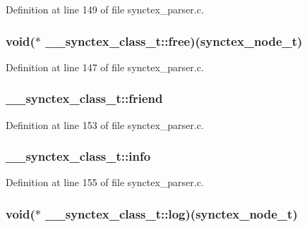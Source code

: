 Definition at line 149 of file synctex\+\_\+parser.\+c.

\hypertarget{struct____synctex__class__t_a251c015a17ed979c27cfc0934ab54f76}{
\subsubsection[{free}]{\setlength{\rightskip}{0pt plus 5cm}void($\ast$ \+\_\+\+\_\+synctex\+\_\+class\+\_\+t\+::free)({\bf synctex\+\_\+node\+\_\+t})}}\label{struct____synctex__class__t_a251c015a17ed979c27cfc0934ab54f76}


Definition at line 147 of file synctex\+\_\+parser.\+c.

\hypertarget{struct____synctex__class__t_a8bbbd0ccfd3281e8209fe1bbc298cf3c}{
\subsubsection[{friend}]{ \+\_\+\+\_\+synctex\+\_\+class\+\_\+t\+::friend}}\label{struct____synctex__class__t_a8bbbd0ccfd3281e8209fe1bbc298cf3c}


Definition at line 153 of file synctex\+\_\+parser.\+c.

\hypertarget{struct____synctex__class__t_ad5458e975bc61bb94761e5c6dbb618f6}{
\subsubsection[{info}]{ \+\_\+\+\_\+synctex\+\_\+class\+\_\+t\+::info}}\label{struct____synctex__class__t_ad5458e975bc61bb94761e5c6dbb618f6}


Definition at line 155 of file synctex\+\_\+parser.\+c.

\hypertarget{struct____synctex__class__t_a25c33b646d9ef2dfa10512fd57e319dd}{
\subsubsection[{log}]{\setlength{\rightskip}{0pt plus 5cm}void($\ast$ \+\_\+\+\_\+synctex\+\_\+class\+\_\+t\+::log)({\bf synctex\+\_\+node\+\_\+t})}}\label{struct____synctex__class__t_a25c33b646d9ef2dfa10512fd57e319dd}


